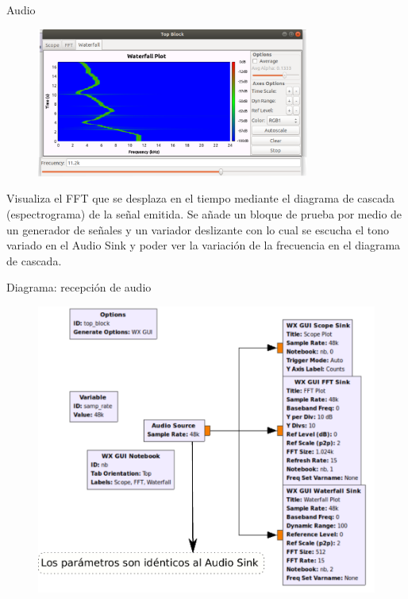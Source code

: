 \begin{frame}{Audio}

\begin{figure}

\begin{center}
\vspace{-6mm}
\includegraphics[width=0.8\textwidth]{parte1/lab4/pdf/lab4_6.pdf}
\end{center}
\end{figure}
\vspace{-3mm}

Visualiza el FFT que se desplaza en el tiempo mediante el diagrama de cascada (espectrograma) de la señal emitida. Se añade un bloque de prueba por medio de un generador de señales y un variador deslizante con lo cual se escucha el tono variado en el Audio Sink y poder ver la variación de la frecuencia en el diagrama de cascada.
\end{frame}

\begin{frame}{Diagrama: recepción de audio}

\begin{figure}

\begin{center}
\includegraphics[width=.73\textwidth]{parte1/lab4/pdf/lab4_7.pdf}
\end{center}
\end{figure}

\end{frame}

